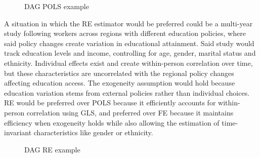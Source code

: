 \begin{figure}[H]
\centering
{}
\caption{DAG POLS example}
\end{figure}
\vspace{-2em}

\newpage

A situation in which the RE estimator would be preferred could be a multi-year study following workers across regions with different education policies, where said policy changes create variation in educational attainment. Said study would track education levels and income, controlling for age, gender, marital status and ethnicity. Individual effects exist and create within-person correlation over time, but these characteristics are uncorrelated with the regional policy changes affecting education access. The exogeneity assumption would hold because education variation stems from external policies rather than individual choices. RE would be preferred over POLS because it efficiently accounts for within-person correlation using GLS, and preferred over FE because it maintains efficiency when exogeneity holds while also allowing the estimation of time-invariant characteristics like gender or ethnicity.

\begin{figure}[H]
\centering
{}
\caption{DAG RE example}
\end{figure}
\vspace{-2em}

